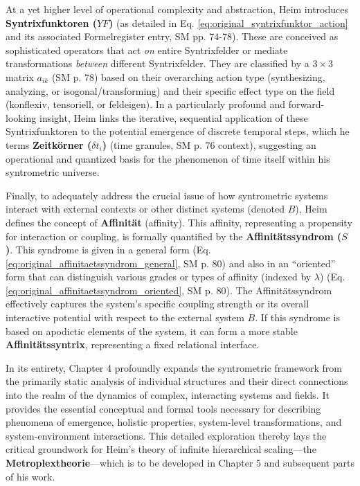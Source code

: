 \documentclass[12pt]{article}
\newcommand{\q}[1]{\enquote{#1}}
\newcommand{\syntrixfunktor}{YF}
\newcommand{\affinitaetssyndrom}{S}
\newcommand{\zeitkorn}{\delta t_i}
\begin{document}
At a yet higher level of operational complexity and abstraction, Heim introduces \textbf{Syntrixfunktoren (\( \syntrixfunktor \))} (as detailed in Eq. \eqref{eq:original_syntrixfunktor_action} and its associated Formelregister entry, SM pp. 74-78). These are conceived as sophisticated operators that act \textit{on} entire Syntrixfelder or mediate transformations \textit{between} different Syntrixfelder. They are classified by a \( 3 \times 3 \) matrix \( a_{ik} \) (SM p. 78) based on their overarching action type (synthesizing, analyzing, or isogonal/transforming) and their specific effect type on the field (konflexiv, tensoriell, or feldeigen). In a particularly profound and forward-looking insight, Heim links the iterative, sequential application of these Syntrixfunktoren to the potential emergence of discrete temporal steps, which he terms \textbf{Zeitkörner (\(\zeitkorn\))} (time granules, SM p. 76 context), suggesting an operational and quantized basis for the phenomenon of time itself within his syntrometric universe.

Finally, to adequately address the crucial issue of how syntrometric systems interact with external contexts or other distinct systems (denoted \( B \)), Heim defines the concept of \textbf{Affinität} (affinity). This affinity, representing a propensity for interaction or coupling, is formally quantified by the \textbf{Affinitätssyndrom (\( \affinitaetssyndrom \))}. This syndrome is given in a general form (Eq. \eqref{eq:original_affinitaetssyndrom_general}, SM p. 80) and also in an \q{oriented} form that can distinguish various grades or types of affinity (indexed by \( \lambda \)) (Eq. \eqref{eq:original_affinitaetssyndrom_oriented}, SM p. 80). The Affinitätssyndrom effectively captures the system's specific coupling strength or its overall interactive potential with respect to the external system \( B \). If this syndrome is based on apodictic elements of the system, it can form a more stable \textbf{Affinitätssyntrix}, representing a fixed relational interface.

In its entirety, Chapter 4 profoundly expands the syntrometric framework from the primarily static analysis of individual structures and their direct connections into the realm of the dynamics of complex, interacting systems and fields. It provides the essential conceptual and formal tools necessary for describing phenomena of emergence, holistic properties, system-level transformations, and system-environment interactions. This detailed exploration thereby lays the critical groundwork for Heim's theory of infinite hierarchical scaling—the \textbf{Metroplextheorie}—which is to be developed in Chapter 5 and subsequent parts of his work.
\end{document}
